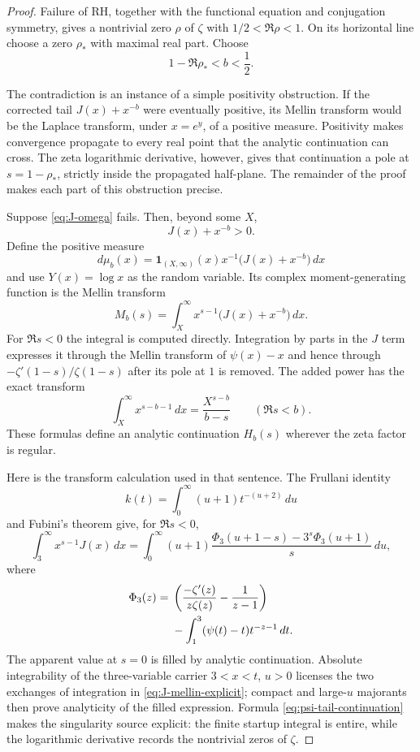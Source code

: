 \documentclass[11pt]{amsart}
\theoremstyle{definition}
\theoremstyle{remark}
\numberwithin{equation}{section}
\newcommand{\RH}{\mathrm{RH}}
\begin{document}
\begin{proof}
Failure of $\RH$, together with the functional equation and conjugation
symmetry, gives a nontrivial zero $\rho$ of $\zeta$ with
$1/2<\Re\rho<1$.  On its horizontal line choose a zero $\rho_*$ with
maximal real part.  Choose
\[
 1-\Re\rho_*<b<\frac12.
\]

The contradiction is an instance of a simple positivity obstruction.
If the corrected tail $J(x)+x^{-b}$ were eventually positive, its Mellin
transform would be the Laplace transform, under $x=e^y$, of a positive
measure.  Positivity makes convergence propagate to every real point that
the analytic continuation can cross.  The zeta logarithmic derivative,
however, gives that continuation a pole at $s=1-\rho_*$, strictly inside
the propagated half-plane.  The remainder of the proof makes each part of
this obstruction precise.

Suppose \eqref{eq:J-omega} fails.  Then, beyond some $X$,
\begin{equation}\label{eq:positive-tail}
  J(x)+x^{-b}>0.
\end{equation}
Define the positive measure
\[
  d\mu_b(x)=\boldsymbol{1}_{(X,\infty)}(x)
       x^{-1}\bigl(J(x)+x^{-b}\bigr)\,dx
\]
and use $Y(x)=\log x$ as the random variable.  Its complex
moment-generating function is the Mellin transform
\begin{equation}\label{eq:landau-mgf}
  M_b(s)=\int_X^\infty x^{s-1}\bigl(J(x)+x^{-b}\bigr)\,dx.
\end{equation}
For $\Re s<0$ the integral is computed directly.  Integration by parts in
the $J$ term expresses it through the Mellin transform of $\psi(x)-x$ and
hence through $-\zeta'(1-s)/\zeta(1-s)$ after its pole at $1$ is removed.
The added power has the exact transform
\[
  \int_X^\infty x^{s-b-1}\,dx=\frac{X^{s-b}}{b-s}
  \qquad(\Re s<b).
\]
These formulas define an analytic continuation $H_b(s)$ wherever the zeta
factor is regular.

Here is the transform calculation used in that sentence.  The Frullani
identity
\[
 k(t)=\int_0^\infty (u+1)t^{-(u+2)}\,du
\]
and Fubini's theorem give, for $\Re s<0$,
\begin{equation}\label{eq:J-mellin-explicit}
 \int_3^\infty x^{s-1}J(x)\,dx
 =\int_0^\infty (u+1)
 \frac{\Phi_3(u+1-s)-3^s\Phi_3(u+1)}{s}\,du,
\end{equation}
where
\begin{align}
 \Phi_3(z)={}&
 \left(\frac{-\zeta'(z)}{z\zeta(z)}-\frac1{z-1}\right)\notag\\
 &-\int_1^3(\psi(t)-t)t^{-z-1}\,dt.
 \label{eq:psi-tail-continuation}
\end{align}
The apparent value at $s=0$ is filled by analytic continuation.  Absolute
integrability of the three-variable carrier $3<x<t$, $u>0$ licenses the two
exchanges of integration in \eqref{eq:J-mellin-explicit}; compact and
large-$u$ majorants then prove analyticity of the filled expression.  Formula
\eqref{eq:psi-tail-continuation} makes the singularity source explicit: the
finite startup integral is entire, while the logarithmic derivative records
the nontrivial zeros of $\zeta$.


\end{proof}
\end{document}
